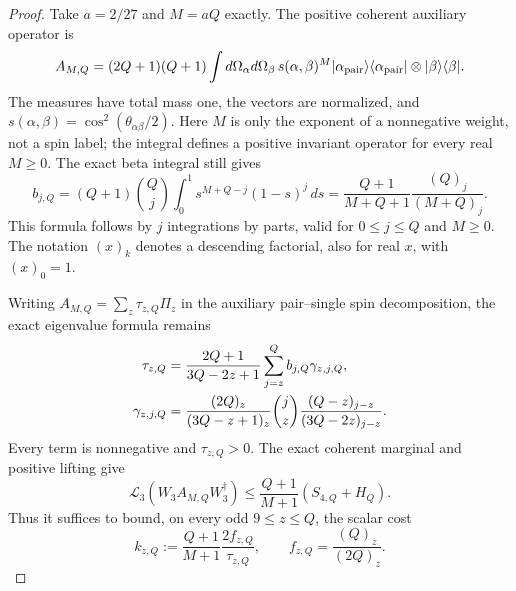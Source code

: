 \documentclass[11pt]{article}
\begin{document}
\begin{proof}
Take $a=2/27$ and $M=aQ$ exactly. The positive coherent auxiliary operator is
\begin{equation}
 A_{M,Q}=(2Q+1)(Q+1)\int d\Omega_\alpha d\Omega_\beta\,
 s(\alpha,\beta)^M
 |\alpha_{\rm pair}\rangle\langle\alpha_{\rm pair}|
 \otimes|\beta\rangle\langle\beta|.
\end{equation}
The measures have total mass one, the vectors are normalized, and
$s(\alpha,\beta)=\cos^2(\theta_{\alpha\beta}/2)$.
Here $M$ is only the exponent of a nonnegative weight, not a spin label;
the integral defines a positive invariant operator for every real $M\ge0$.
The exact beta integral still gives
\begin{equation}
 b_{j,Q}=(Q+1)\binom Qj\int_0^1s^{M+Q-j}(1-s)^j\,ds
 =\frac{Q+1}{M+Q+1}\frac{(Q)_j}{(M+Q)_j}.
\end{equation}
This formula follows by $j$ integrations by parts, valid for
$0\le j\le Q$ and $M\ge0$. The notation $(x)_k$ denotes a descending
factorial, also for real $x$, with $(x)_0=1$.

Writing $A_{M,Q}=\sum_z\tau_{z,Q}\Pi_z$ in the auxiliary pair--single
spin decomposition, the exact eigenvalue formula remains
\begin{align}
 \tau_{z,Q}&=\frac{2Q+1}{3Q-2z+1}
                 \sum_{j=z}^Q b_{j,Q}\gamma_{z,j,Q},\notag\\
 \gamma_{z,j,Q}&=\frac{(2Q)_z}{(3Q-z+1)_z}
                 \binom jz\frac{(Q-z)_{j-z}}{(3Q-2z)_{j-z}}.
 \label{eq:optimized-tail-eigenvalue}
\end{align}
Every term is nonnegative and $\tau_{z,Q}>0$. The exact coherent marginal
and positive lifting give
\begin{equation}
 \mathcal L_3(W_3A_{M,Q}W_3^\dagger)
 \le\frac{Q+1}{M+1}(S_{4,Q}+H_Q).
\end{equation}
Thus it suffices to bound, on every odd $9\le z\le Q$, the scalar cost
\begin{equation}\label{eq:optimized-tail-cost}
 k_{z,Q}:=\frac{Q+1}{M+1}\frac{2f_{z,Q}}{\tau_{z,Q}},
 \qquad f_{z,Q}=\frac{(Q)_z}{(2Q)_z}.
\end{equation}


\end{proof}
\end{document}
